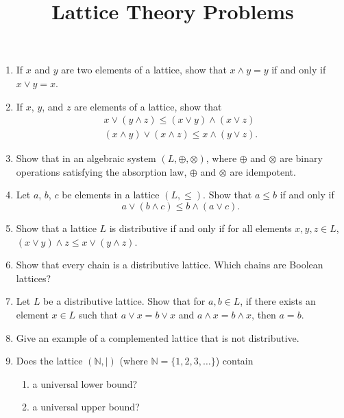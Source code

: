 \documentclass[svgnames]{amsart}
\title{Lattice Theory Problems}
\date{}
\begin{document}
\maketitle
\begin{enumerate}[leftmargin=*]
\item If $x$ and $y$ are two elements of a lattice, show that $x \wedge y = y$ if and only if $x \vee y = x$.

\item If $x$, $y$, and $z$ are elements of a lattice, show that
\begin{align*}
x \vee (y \wedge z) \le (x \vee y) \wedge (x \vee z) \\
(x \wedge y) \vee (x \wedge z) \le x \wedge (y \vee z).
\end{align*}

\item Show that in an algebraic system $(L, \oplus, \otimes)$, where $\oplus$ and $\otimes$ are binary operations satisfying the absorption law, $\oplus$ and $\otimes$ are idempotent.

\item Let $a$, $b$, $c$ be elements in a lattice $(L, \le)$. Show that $a \le b$ if and only if
\begin{equation*}
a \vee (b \wedge c) \le b \wedge (a \vee c).
\end{equation*}

\item Show that a lattice $L$ is distributive if and only if for all elements $x, y, z \in L$, $(x \vee y) \wedge z \le x \vee (y \wedge z)$.

\item Show that every chain is a distributive lattice. Which chains are Boolean lattices?

\item Let $L$ be a distributive lattice. Show that for $a, b \in L$, if there exists an element $x \in L$ such that $a \vee x = b \vee x$ and $a \wedge x = b \wedge x$, then $a = b$.

\item Give an example of a complemented lattice that is not distributive.

\item Does the lattice $(\mathbb N, \mid)$ (where $\mathbb N = \{1, 2, 3, \ldots\}$) contain
\begin{enumerate}
\item a universal lower bound?
\item a universal upper bound?
\end{enumerate}


\end{enumerate}
\end{document}
